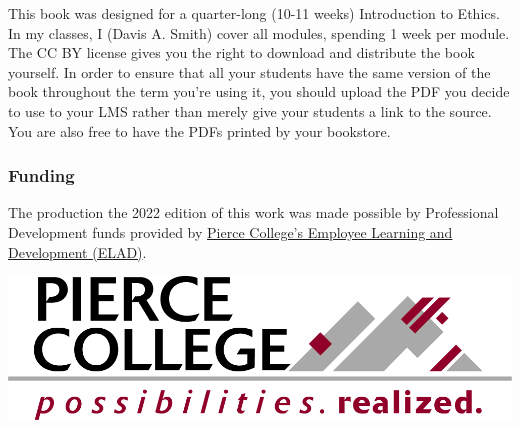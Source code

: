 This book was designed for a quarter-long (10-11 weeks) Introduction to Ethics. In my classes, I (Davis A. Smith) cover all modules, spending 1 week per module. The CC BY license gives you the right to download and distribute the book yourself. In order to ensure that all your students have the same version of the book throughout the term you’re using it, you should upload the PDF you decide to use to your LMS rather than merely give your students a link to the source. You are also free to have the PDFs printed by your bookstore.

\subsubsection{Funding}

The production the 2022 edition of this work was made possible by Professional Development funds provided by \href{https://www.pierce.ctc.edu/elad}{Pierce College's Employee Learning and Development (ELAD)}. 


\includegraphics{marcom-PierceCollege-Logo.png}



\bigskip
